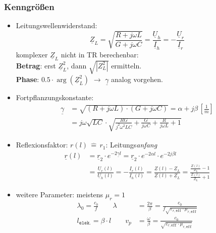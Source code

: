 \subsubsection{Kenngrößen} 
\begin{itemize}
\item Leitungswellenwiderstand:
\begin{equation*}
    \underline{Z}_L = \sqrt{ \frac{R + j \omega L}{G + j \omega C}} = \frac{\underline{U}_h}{\underline{I}_h} =- \frac{\underline{U}_r}{\underline{I}_r}
\end{equation*}
komplexer $\underline{Z}_L$ nicht in TR berechenbar:\\
\textbf{Betrag}: erst $\underline{Z}_L^2$, dann $\sqrt{|Z_L^2|}$ ermitteln.\\
\textbf{Phase}: $0.5 \cdot \arg(\underline{Z}_L^2)$ \quad
$\rightarrow$  $\underline{\gamma}$ analog vorgehen.

\item Fortpflanzungskonstante:
\begin{align*}
	\underline{\gamma} & = \sqrt{(R+j\omega L)\cdot(G+j\omega C)} = \alpha + j \beta \, \left[ \frac{1}{m} \right]  \\
	& = j \omega \sqrt{LC} \cdot \sqrt{ \frac{RG}{j^2 \omega^2 LC} + \frac{G}{j \omega C} + \frac{R}{j \omega L} + 1}
\end{align*}
\item Reflexionsfaktor: \qquad
$ r(l) \, \widehat{=} \, r_1 $: Leitungs\textit{anfang} 
\begin{align*}
	\underline{r}(l) &= \underline{r}_2 \cdot e^{-2\underline{\gamma}l} = \underline{r}_2\cdot e^{-2\alpha l}\cdot e^{-2j\beta l}\\
	 &= 	\frac{\underline{U}_r(l)}{\underline{U}_h(l)} = -\frac{\underline{I}_r(l)}{\underline{I}_h(l)}
	=\frac{\underline{Z}(l)-\underline{Z}_L}{\underline{Z}(l)+\underline{Z}_L} = \frac{\tfrac{Z(l)}{Z_L}-1}{\tfrac{Z(l)}{Z_L}+1}
\end{align*}
\item weitere Parameter: \qquad meistens $ \mu_r = 1 $
\begin{align*}
    \lambda_0  = \frac{c_0}{f} \qquad \lambda & = \frac{2\pi}{\beta} = \frac{c_0}{f\sqrt{\varepsilon_{r,\texttt{eff}}\cdot \mu_{r,\texttt{eff}}}} \\
    l_{\texttt{elek.}} = \beta \cdot l \qquad v_p & = \frac{\omega}{\beta} = \frac{c_0}{\sqrt{\varepsilon_{r,\texttt{eff}}\cdot \mu_{r,\texttt{eff}}}}
\end{align*}
\end{itemize}
